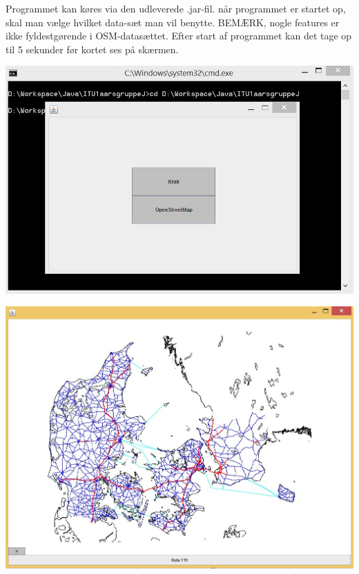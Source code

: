 Programmet kan køres via den udleverede .jar-fil. når programmet er startet op, skal man vælge hvilket data-sæt man vil benytte. BEMÆRK, nogle features er ikke fyldestgørende i OSM-datasættet.
Efter start af programmet kan det tage op til 5 sekunder før kortet ses på skærmen.

\begin{center}
\includegraphics[width=(\textwidth)/2]{brugervejledning/vaelgdata}
\end{center}

\begin{center}
\includegraphics[width=(\textwidth)/2]{brugervejledning/renkort}
\end{center}

